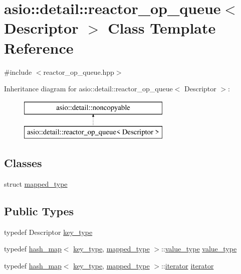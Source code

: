 \hypertarget{classasio_1_1detail_1_1reactor__op__queue}{}\section{asio\+:\+:detail\+:\+:reactor\+\_\+op\+\_\+queue$<$ Descriptor $>$ Class Template Reference}
\label{classasio_1_1detail_1_1reactor__op__queue}


{\ttfamily \#include $<$reactor\+\_\+op\+\_\+queue.\+hpp$>$}

Inheritance diagram for asio\+:\+:detail\+:\+:reactor\+\_\+op\+\_\+queue$<$ Descriptor $>$\+:\begin{figure}[H]
\begin{center}
\leavevmode
\includegraphics[height=2.000000cm]{classasio_1_1detail_1_1reactor__op__queue}
\end{center}
\end{figure}
\subsection*{Classes}
\begin{DoxyCompactItemize}
\item 
struct \hyperlink{structasio_1_1detail_1_1reactor__op__queue_1_1mapped__type}{mapped\+\_\+type}
\end{DoxyCompactItemize}
\subsection*{Public Types}
\begin{DoxyCompactItemize}
\item 
typedef Descriptor \hyperlink{classasio_1_1detail_1_1reactor__op__queue_ae750b96efe78afd9b508725eedcd6b8b}{key\+\_\+type}
\item 
typedef \hyperlink{classasio_1_1detail_1_1hash__map}{hash\+\_\+map}$<$ \hyperlink{classasio_1_1detail_1_1reactor__op__queue_ae750b96efe78afd9b508725eedcd6b8b}{key\+\_\+type}, \hyperlink{structasio_1_1detail_1_1reactor__op__queue_1_1mapped__type}{mapped\+\_\+type} $>$\+::\hyperlink{classasio_1_1detail_1_1reactor__op__queue_ac701f8db7606c9f4f1457116046b7b31}{value\+\_\+type} \hyperlink{classasio_1_1detail_1_1reactor__op__queue_ac701f8db7606c9f4f1457116046b7b31}{value\+\_\+type}
\item 
typedef \hyperlink{classasio_1_1detail_1_1hash__map}{hash\+\_\+map}$<$ \hyperlink{classasio_1_1detail_1_1reactor__op__queue_ae750b96efe78afd9b508725eedcd6b8b}{key\+\_\+type}, \hyperlink{structasio_1_1detail_1_1reactor__op__queue_1_1mapped__type}{mapped\+\_\+type} $>$\+::\hyperlink{classasio_1_1detail_1_1reactor__op__queue_a3c73fd6c8576d3a1ad1eb4f320f2395a}{iterator} \hyperlink{classasio_1_1detail_1_1reactor__op__queue_a3c73fd6c8576d3a1ad1eb4f320f2395a}{iterator}
\end{DoxyCompactItemize}
